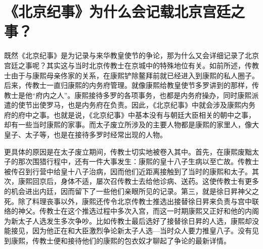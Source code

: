 \begin{sectionnotes}







\end{sectionnotes}
\section{《北京纪事》为什么会记载北京宫廷之事？}


既然《北京纪事》是为记录与来华教皇使节的争论，那为什么又会详细记录了北京宫廷之事呢？其实这与当时北京传教士在京城中的特殊地位有关。如前所述，传教士由于与康熙母亲佟家的关系，在康熙铲除鳌拜前就已经进入到康熙的私人圈子。后来，传教士一直归康熙的内务府管理。就像康熙给教皇使节多罗讲到的那样，传教士是他“府内之人”。康熙接待多罗的各项事务，也都是内务府操办，同时康熙派遣的使节出使罗马，也是内务府在负责。因此，《北京纪事》中就会涉及康熙内务府的府中之事。也就是说，《北京纪事》中基本没有与朝廷大臣相关的朝中之事，却有一些当时康熙的家事。而太子废立所涉及的主要人物都是康熙的家里人，像大皇子、太子等，也是在接待多罗时经常出现的人物。



更具体的原因是在太子废立期间，传教士切实地被卷入其中。首先，在康熙废黜太子的那次围猎行程中，还有一件大事发生：康熙的皇十八子生病以至亡故。传教士被传召到行营中给皇十八子治病，因而他们近距离接触到了当时的康熙和太子。其次，康熙回京后，身体不适，屡次召传教士去给他诊病、送药。这使传教士有更多的机会进出内廷，因而留下了一些他们亲眼所见的记录。第三，就是徐日昇神父之死。除了料理丧事以外，康熙还传令北京传教士推选出接替徐日昇来负责与宫中联络的神父。传教士在这个推选过程中多次入宫，而这一时期康熙又正好和他的内阁为新太子人选发生多次争吵。比如传教士最后选好了接替徐日昇的人选，康熙却没能接见，因为他正在和大臣激烈争论新太子人选—当时众人要力推皇八子。没有见到康熙，传教士便和接待他们的康熙的包衣奴才聊起了争论的最新详情。


